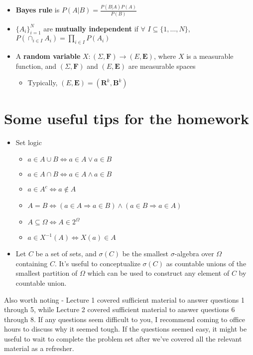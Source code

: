 \documentclass[12pt,english]{article}
\begin{document}
\begin{itemize}
	\item \textbf{Bayes rule} is $P(A | B) = \frac{P(B | A) P(A)}{P(B)}$
	\item $\{ A_{i} \}_{i = 1}^{N}$ are \textbf{mutually independent} if $\forall$ $I \subseteq \{1, \ldots, N\}$, $P(\cap_{i \in I} A_{i}) = \prod_{i \in I} P(A_{i})$
	\item A \textbf{random variable} $X : (\Sigma, \mathbf{F}) \to (E, \mathbf{E})$, where $X$ is a measurable function, and $(\Sigma, \mathbf{F})$ and $(E, \mathbf{E})$ are measurable spaces
	\begin{itemize}
		\item Typically, $(E, \mathbf{E}) = (\mathbf{R}^{k}, \mathbf{B}^{k})$
	\end{itemize}
\end{itemize}

\section{Some useful tips for the homework}

\begin{itemize}
	\item Set logic
	\begin{itemize}
		\item $a \in A \cup B \Leftrightarrow a \in A \vee a \in B$
		\item $a \in A \cap B \Leftrightarrow a \in A \wedge a \in B$
		\item $a \in A^{c} \Leftrightarrow a \notin A$
		\item $A = B \Leftrightarrow (a \in A \Rightarrow a \in B) \wedge (a \in B \Rightarrow a \in A)$
		\item $A \subseteq \Omega \Leftrightarrow A \in 2^{\Omega}$
		\item $a \in X^{-1}(A) \Leftrightarrow X(a) \in A$
	\end{itemize}
	\item Let $C$ be a set of sets, and $\sigma(C)$ be the smallest $\sigma$-algebra over $\Omega$ containing $C$. It's useful to conceptualize $\sigma(C)$ as countable unions of the smallest partition of $\Omega$ which can be used to construct any element of $C$ by countable union.
\end{itemize}

\vspace{1em}
Also worth noting - Lecture 1 covered sufficient material to answer questions 1 through 5, while Lecture 2 covered sufficient material to answer questions 6 through 8. If any questions seem difficult to you, I recommend coming to office hours to discuss why it seemed tough. If the questions seemed easy, it might be useful to wait to complete the problem set after we've covered all the relevant material as a refresher.
\end{document}
